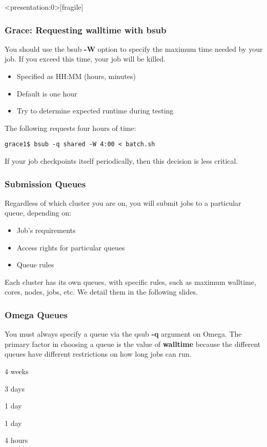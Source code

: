 \documentclass[10pt]{beamer}
\begin{document}
\begin{frame}<presentation:0>[fragile]
\frametitle{Grace: Requesting walltime with bsub}
You should use the bsub \textbf{-W} option to specify the maximum time
needed by your job. If you exceed this time, your job will be killed.

\begin{itemize}
\item Specified as HH:MM (hours, minutes)
\item Default is one hour
\item Try to determine expected runtime during testing
\end{itemize}

The following requests four hours of time:

\begin{verbatim}
grace1$ bsub -q shared -W 4:00 < batch.sh
\end{verbatim}

If your job checkpoints itself periodically, then this decision is
less critical.
\end{frame}

\begin{frame}[fragile]
\frametitle{Submission Queues}

Regardless of which cluster you are on, you will submit jobs to a particular queue, depending on:
\begin{itemize}
\item{Job's requirements}
\item{Access rights for particular queues}
\item{Queue rules}
\end{itemize}

Each cluster has its own queues, with specific rules, such as maximum walltime, cores, nodes, jobs, etc.  
We detail them in the following slides.
\vspace{0.1in}


\end{frame}

\begin{frame}
\frametitle{Omega Queues}
You must always specify a queue via the qsub \textbf{-q} argument on
Omega.  The primary factor in choosing a queue is the value of
\textbf{walltime} because the different queues have different
restrictions on how long jobs can run.

\vskip10pt
\begin{description}
\item[fas\_very\_long]       4 weeks
\item[fas\_long]             3 days
\item[fas\_high]             1 day
\item[fas\_normal]           1 day
\item[fas\_devel]            4 hours
\end{description}

\end{frame}
\end{document}
